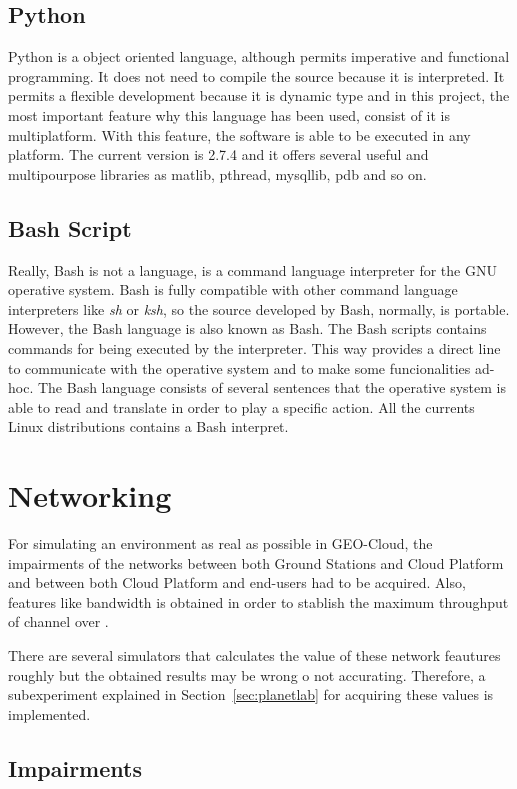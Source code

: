 \subsection{Python}
Python is a object oriented language, although permits imperative and functional
programming. It does not need to compile the source because it is
interpreted. It permits a flexible development because it is dynamic type and in
this project, the most important feature why this language has been used,
consist of it is multiplatform. With this feature, the software is able to be
executed in any platform. The current version is 2.7.4 and it offers several
useful and multipourpose libraries as matlib, pthread, mysqllib, pdb and so on.

\subsection{Bash Script}

Really, Bash is not a language, is a command language interpreter for the GNU
operative system. Bash is fully compatible with other command language
interpreters like \emph{sh} or \emph{ksh}, so the source developed by Bash, normally, is
portable. 
However, the Bash language is also known as Bash. The Bash scripts contains
commands for being executed by the interpreter. This way provides a direct line
to communicate with the operative system and to make some funcionalities ad-hoc.
The Bash language consists of several sentences that the operative system is
able to read and translate in order to play a specific action. All the currents
Linux distributions contains a Bash interpret. 


\section{Networking}

For simulating an environment as real as possible in GEO-Cloud, the impairments  of the networks between both Ground Stations and Cloud Platform
and between both Cloud Platform and end-users had to be acquired. Also, features
like bandwidth is obtained in order to stablish the maximum throughput of
channel over \vw.

There are several simulators that
calculates the value of these network feautures roughly but the obtained results
may be wrong o not accurating. Therefore, a subexperiment explained in
Section~\ref{sec:planetlab} for acquiring these values is implemented. 

\subsection{Impairments}

